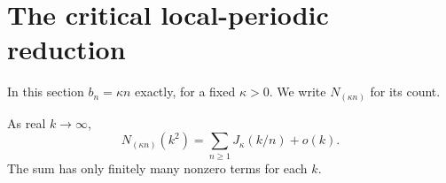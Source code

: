 \section{The critical local-periodic reduction}
\label{sec:reduction}

In this section $b_n=\kappa n$ exactly, for a fixed
$\kappa>0$. We write $N_{(\kappa n)}$ for its count.

\begin{proposition}
\label{prop:reduction}
As real $k\to\infty$,
\begin{equation}
 N_{(\kappa n)}(k^2)=\sum_{n\ge1}J_\kappa(k/n)+o(k).
 \label{eq:local-periodic-reduction}
\end{equation}
The sum has only finitely many nonzero terms for each $k$.
\end{proposition}

